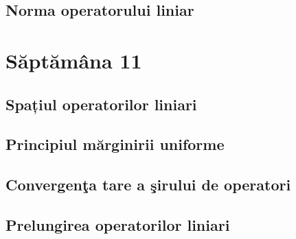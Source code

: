\documentclass[a4paper,12pt]{article}
\theoremstyle{change}
\begin{document}
\subsection{Norma operatorului liniar}

\section{Săptămâna 11}


\subsection{Spațiul operatorilor liniari}

\subsection{Principiul mărginirii uniforme}


\subsection{Convergenţa tare a şirului de operatori}

\subsection{Prelungirea operatorilor liniari}
\end{document}
